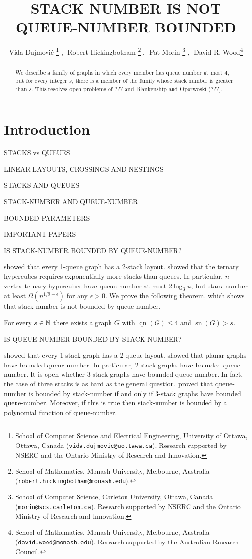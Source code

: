 \documentclass[kpfonts]{patmorin}
\title{\MakeUppercase{Stack Number is not Queue-Number Bounded}}
\author{Vida Dujmovi\'c%
	\thanks{School of Computer Science and Electrical Engineering,
		University of Ottawa, Ottawa, Canada (\texttt{vida.dujmovic@uottawa.ca}).
		Research supported by NSERC and the Ontario Ministry of Research and Innovation.}
	,\,\,
	Robert Hickingbotham%
	\thanks{School of Mathematics, Monash University, Melbourne, Australia (\texttt{robert.hickingbotham@monash.edu}).}
	,\,\,
	Pat Morin%
	\thanks{School of Computer Science, Carleton University, Ottawa, Canada (\texttt{morin@scs.carleton.ca}). Research  supported by NSERC and the Ontario Ministry of Research and Innovation.}
	,\,\, 
	David R. Wood\thanks{School of Mathematics, Monash University, Melbourne, Australia (\texttt{david.wood@monash.edu}). Research supported by the Australian Research Council.}
}
\DeclareMathOperator{\sn}{sn}
\DeclareMathOperator{\qn}{qn}
\renewcommand{\le}{\leqslant}
\begin{document}
\maketitle

\begin{abstract}
  We describe a family of graphs in which every member has queue number at most 4, but for every integer $s$, there is a member of the family whose stack number is greater than $s$. This resolves open problems of ??? and Blankenship and Oporwoski (???).
\end{abstract}

\section{Introduction}

STACKS vs QUEUES

LINEAR LAYOUTS, CROSSINGS AND NESTINGS

STACKS AND QUEUES

STACK-NUMBER AND QUEUE-NUMBER

BOUNDED PARAMETERS

IMPORTANT PAPERS \citep{HLR92,CLR87,Pupyrev20,DujWoo05,HR92}

IS STACK-NUMBER BOUNDED BY QUEUE-NUMBER? 

\citet{HLR92} showed that every 1-queue graph has a 2-stack layout. 
\citet{HLR92} showed that the ternary hypercubes requires exponentially more stacks than queues. In particular, $n$-vertex ternary hypercubes have queue-number at most $2 \log_3 n$, but stack-number at least $\Omega(n^{1/9-\epsilon})$ for any $\epsilon>0$. We prove the following theorem, which shows that stack-number is not bounded by queue-number. 

\begin{thm}\label{family}
 For every $s\in \mathbb{N}$ there exists a graph $G$ with $\qn(G)\le 4$ and $\sn(G)>s$.  
\end{thm}

IS QUEUE-NUMBER BOUNDED BY STACK-NUMBER?

\citet{HLR92} showed that every 1-stack graph has a 2-queue layout. \citet{DJMMUW20} showed that planar graphs have bounded queue-number. In particular, 2-stack graphs have bounded queue-number. It is open whether 3-stack graphs have bounded queue-number. In fact, the case of three stacks is as hard as the general question. \citet{DujWoo05} proved that queue-number is bounded by stack-number if and only if 3-stack graphs have bounded queue-number. Moreover, if this is true then stack-number is bounded by a polynomial function of queue-number.
\end{document}
